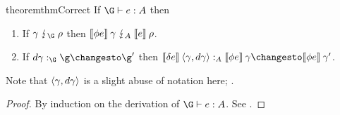 \begin{restatable}[Correctness]{theorem}{thmCorrect}\label{thm:correct}
  If $\J e \G A$ then

  \begin{enumerate}
  \item If $\gamma \impls_\G \rho$ then \(\den{\phi e} \<\gamma \impls_A \den{e}
    \<\rho\).
  \item If $\changesat{\G}{\dgamma}{\g}{\g'}$ then \(\changesat{A}{\den{\delta
      e} \<\tuple{\gamma,\dgamma}}{\den{\phi e} \<\gamma}{\den{\phi e}
    \<\gamma'}\).
  \end{enumerate}


  \noindent
  Note that $\langle{\gamma,d\gamma}\rangle$ is a slight abuse of notation here;
  .
\end{restatable}
\begin{proof}
  By induction on the derivation of $\J e \G A$. See .
\end{proof}


